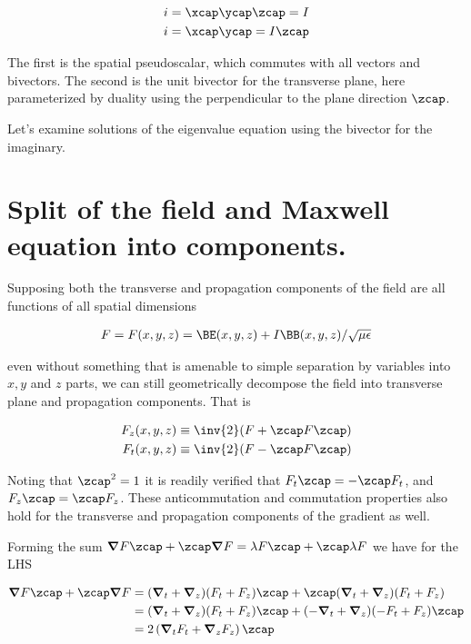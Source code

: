 \begin{align*}
i &= \xcap\ycap\zcap = I \\
i &= \xcap \ycap = I \zcap
\end{align*}

The first is the spatial pseudoscalar, which commutes with all vectors and bivectors.  The second is the unit bivector for the transverse plane, here parameterized by duality using the perpendicular to the plane direction $\zcap$.

Let's examine solutions of the eigenvalue equation using the bivector for the imaginary.

\section{Split of the field and Maxwell equation into components.}

Supposing both the transverse and propagation components of the field are all functions of all spatial dimensions

\begin{align}\label{eqn:foo4}
F = F(x,y,z) = \BE(x,y,z) + I\BB(x,y,z)/\sqrt{\mu\epsilon}
\end{align}

even without something that is amenable to simple separation by variables into $x,y$ and $z$ parts, we can still geometrically decompose the field into transverse plane and propagation components.  That is

\begin{align}\label{eqn:foo5}
F_z(x,y,z) &\equiv \inv{2}(F + \zcap F \zcap) \\
F_t(x,y,z) &\equiv \inv{2}(F - \zcap F \zcap)
\end{align}

Noting that $\zcap^2 = 1$ it is readily verified that $F_t \zcap = - \zcap F_t$, and $F_z \zcap = \zcap F_z$.  These anticommutation and commutation properties also hold for the transverse and propagation components of the gradient as well.

Forming the sum $\spacegrad F \zcap + \zcap \spacegrad F = \lambda F \zcap + \zcap \lambda F$ we have for the LHS

\begin{align*}
\spacegrad F \zcap + \zcap \spacegrad F 
&= (\spacegrad_t + \spacegrad_z) (F_t + F_z) \zcap + \zcap (\spacegrad_t + \spacegrad_z) (F_t + F_z)  \\
&= (\spacegrad_t + \spacegrad_z) (F_t + F_z) \zcap + (-\spacegrad_t + \spacegrad_z) (-F_t + F_z) \zcap  \\
&= 2 \left( \spacegrad_t F_t + \spacegrad_z F_z \right) \zcap
\end{align*}


